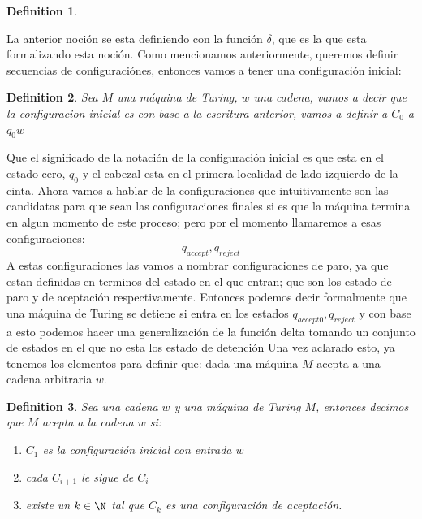 \documentclass[10pt]{report}
\newtheorem{definition}{Definition}
\begin{document}
{\begin{definition}
    \end{definition}
    La anterior noción se esta definiendo con la función $\delta$, que es la que esta formalizando esta noción.
    Como mencionamos anteriormente, queremos definir secuencias de configuraciónes, entonces
    vamos a tener una configuración inicial:
    \begin{definition}
        Sea $M$ una máquina de Turing, $w$ una cadena,
        vamos a decir que la configuracion inicial es con base a la escritura
        anterior, vamos a definir a $C_{0}$ a $q_{0}w$
    \end{definition}
    Que el significado de la notación de la configuración inicial es que esta en
    el estado cero, $q_{0}$ y el cabezal esta en el primera localidad de lado izquierdo de la cinta.
    Ahora vamos a hablar de la configuraciones que intuitivamente son las candidatas para
    que sean las configuraciones finales si es que la máquina termina en algun momento de este
    proceso; pero por el momento llamaremos a esas configuraciones:\newline
    \begin{equation}
        q_{accept}, q_{reject}\label{eq:equation8}
    \end{equation}
    A estas configuraciones las vamos a nombrar configuraciones de paro, ya que estan definidas
    en terminos del estado en el que entran; que son los estado de paro y de aceptación respectivamente.
    Entonces podemos decir formalmente que una máquina de Turing se detiene si entra en los estados
    $q_{accept0},q_{reject}$ y con base a esto podemos hacer una generalización de la función delta tomando
    un conjunto de estados en el que no esta los estado de detención
    \newline
    Una vez aclarado esto, ya tenemos los elementos para definir que: dada una máquina $M$ acepta a una
    cadena arbitraria $w$.
    \begin{definition}
        Sea una cadena $w$ y una máquina de Turing $M$,\newline
        entonces decimos que $M$ acepta a la cadena $w$ si:
        \begin{enumerate}
            \item $C_{1}$ es la configuración inicial con entrada $w$
            \item cada $C_{i+1}$ le sigue de $C_{i}$
            \item existe un $k \in \N$ tal que $C_{k}$ es una configuración de aceptación.

\end{enumerate}
\end{definition}}
\end{document}
